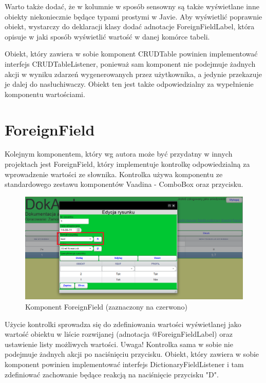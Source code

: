 Warto także dodać, że w kolumnie w sposób sensowny są także wyświetlane inne obiekty niekoniecznie będące typami prostymi w Javie. Aby wyświetlić poprawnie obiekt, wystarczy do deklaracji klasy dodać adnotacje ForeignFieldLabel, która opisuje w jaki sposób wyświetlić wartość w danej komórce tabeli.

Obiekt, który zawiera w sobie komponent CRUDTable powinien implementować interfejs CRUDTableListener, ponieważ sam komponent nie podejmuje żadnych akcji w wyniku zdarzeń wygenerowanych przez użytkownika, a jedynie przekazuje je dalej do nasłuchiwaczy. Obiekt ten jest także odpowiedzialny za wypełnienie komponentu wartościami.

\section{ForeignField}
Kolejnym komponentem, który wg autora może być przydatny w innych projektach jest ForeignField, który implementuje kontrolkę odpowiedzialną za wprowadzenie wartości ze słownika. Kontrolka używa komponentu ze standardowego zestawu komponentów Vaadina - ComboBox oraz przycisku.

\newpage
\begin{figure} [H]
    \begin{center}
	\includegraphics[scale=.6]{img/foreignField.png}
	\caption{Komponent ForeignField (zaznaczony na czerwono)}
	\label{formField}
    \end{center}
\end{figure}

Użycie kontrolki sprowadza się do zdefiniowania wartości wyświetlanej jako wartość obiektu w liście rozwijanej (adnotacja @ForeignFieldLabel) oraz ustawienie listy możliwych wartości. Uwaga! Kontrolka sama w sobie nie podejmuje żadnych akcji po naciśnięciu przycisku. Obiekt, który zawiera w sobie komponent powinien implementować interfejs DictionaryFieldListener i tam zdefiniować zachowanie będące reakcją na naciśnięcie przycisku "D".
